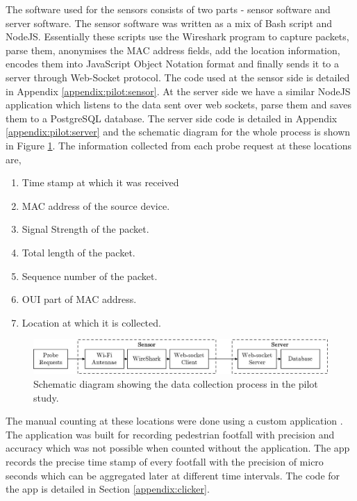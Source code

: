 The software used for the sensors consists of two parts - sensor software and server software.
The sensor software was written as a mix of Bash script and NodeJS.
Essentially these scripts use the Wireshark program to capture packets, parse them, anonymises the MAC address fields, add the location information, encodes them into JavaScript Object Notation format and finally sends it to a server through Web-Socket protocol.
The code used at the sensor side is detailed in Appendix \ref{appendix:pilot:sensor}.
At the server side we have a similar NodeJS application which listens to the data sent over web sockets, parse them and saves them to a PostgreSQL database.
The server side code is detailed in Appendix \ref{appendix:pilot:server} and the schematic diagram for the whole process is shown in Figure \ref{figure:collection:pilot:schema}.
The information collected from each probe request at these locations are,

\begin{enumerate}[leftmargin=4em, rightmargin=2em]
  \itemsep-0.25em
  \item Time stamp at which it was received
  \item MAC address of the source device.
  \item Signal Strength of the packet.
  \item Total length of the packet.
  \item Sequence number of the packet.
  \item OUI part of MAC address.
  \item Location at which it is collected.
\end{enumerate}

\begin{figure}
  \includegraphics{images/pilot-study-system.jpeg}
  \caption{Schematic diagram showing the data collection process in the pilot study.}
  \label{figure:collection:pilot:schema}
\end{figure}

The manual counting at these locations were done using a custom application \citet{bala2018}. The application was built for recording pedestrian footfall with precision and accuracy which was not possible when counted without the application. The app records the precise time stamp of every footfall with the precision of micro seconds which can be aggregated later at different time intervals. The code for the app is detailed in Section \ref{appendix:clicker}.

